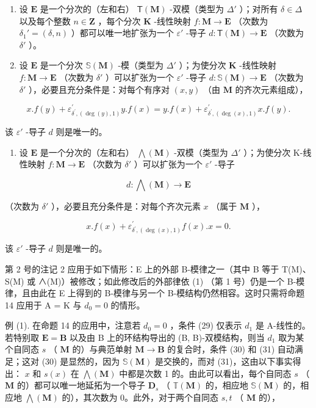 \begin{enumerate}
\def\labelenumi{(\roman{enumi})}
\item
  设 \(\mathbf{E}\) 是一个分次的（左和右） \(\mathsf{T}(\mathbf{M})\) -双模（类型为 \(\Delta'\) ）；对所有 \(\delta \in \Delta\) 以及每个整数 \(n \in \mathbf{Z}\) ，每个分次 \(\mathbf{K}\) -线性映射 \(f: \mathbf{M} \to \mathbf{E}\) （次数为 \(\delta_1' = (\delta, n)\) ）都可以唯一地扩张为一个 \(\varepsilon'\) -导子 \(d: \mathsf{T}(\mathbf{M}) \to \mathbf{E}\) （次数为 \(\delta'\) ）。
\item
  设 \(\mathbf{E}\) 是一个分次 \(\mathbb{S}(\mathbf{M})\) -模（类型为 \(\Delta'\) ）；为使分次 \(\mathbf{K}\) -线性映射 \(f: \mathbf{M} \to \mathbf{E}\) （次数为 \(\delta'\) ）可以扩张为一个 \(\varepsilon'\) -导子 \(d: \mathbb{S}(\mathbf{M}) \to \mathbf{E}\) （次数为 \(\delta'\) ），必要且充分条件是：对每个有序对 \((x, y)\) （由 \(\mathbf{M}\) 的齐次元素组成），
\end{enumerate}

\[
x. f (y) + \varepsilon_ {\delta^ {\prime}, (\deg (y), 1)} ^ {\prime} y. f (x) = y. f (x) + \varepsilon_ {\delta^ {\prime}, (\deg (x), 1)} ^ {\prime} x. f (y).\tag{33}
\]

该 \(\varepsilon'\) -导子 \(d\) 则是唯一的。

\begin{enumerate}
\def\labelenumi{(\roman{enumi})}
\setcounter{enumi}{2}
\tightlist
\item
  设 \(\mathbf{E}\) 是一个分次的（左和右） \(\bigwedge (\mathbf{M})\) -双模（类型为 \(\Delta'\) ）；为使分次 K-线性映射 \(f: \mathbf{M} \to \mathbf{E}\) （次数为 \(\delta'\) ）可以扩张为一个 \(\varepsilon'\) -导子
\end{enumerate}

\[
d: \bigwedge (\mathbf {M}) \rightarrow \mathbf {E}
\]

（次数为 \(\delta'\) ），必要且充分条件是：对每个齐次元素 \(x\) （属于 \(\mathbf{M}\) ），

\[
x. f (x) + \varepsilon_ {\delta ^ {\prime}, (\deg (x), 1)} ^ {\prime} f (x). x = 0.\tag{34}
\]

该 \(\varepsilon'\) -导子 \(d\) 则是唯一的。

第 2 号的注记 2 应用于如下情形：E 上的外部 B-模律之一（其中 B 等于 T(M)、S(M) 或 ∧(M)）被修改；如此修改后的外部律依 (1) （第 1 号）仍是一个 B-模律，且由此在 E 上得到的 B-模律与另一个 B-模结构仍然相容。这时只需将命题 14 应用于 A = K 与 \(d_{0} = 0\) 的情形。

例 (1). 在命题 14 的应用中，注意若 \(d_0 = 0\) ，条件 (29) 仅表示 \(d_1\) 是 A-线性的。若特别取 \(\mathbf{E} = \mathbf{B}\) 以及由 B 上的环结构导出的 (B, B)-双模结构，则当 \(d_1\) 取为某个自同态 \(s\) （ \(\mathbf{M}\) 的）与典范单射 \(\mathbf{M} \to \mathbf{B}\) 的复合时，条件 (30) 和 (31) 自动满足；这对 (30) 是显然的，因为 \(\mathbb{S}(\mathbf{M})\) 是交换的，而对 (31)，这由以下事实得出： \(x\) 和 \(s(x)\) 在 \(\bigwedge (\mathbf{M})\) 中都是次数 1 的。由此可以看出，每个自同态 \(s\) （ \(\mathbf{M}\) 的）都可以唯一地延拓为一个导子 \(\mathbf{D}_s\) （ \(\mathbb{T}(\mathbf{M})\) 的，相应地 \(\mathbb{S}(\mathbf{M})\) 的，相应地 \(\bigwedge (\mathbf{M})\) 的），其次数为 0。此外，对于两个自同态 \(s, t\) （ \(\mathbf{M}\) 的），

